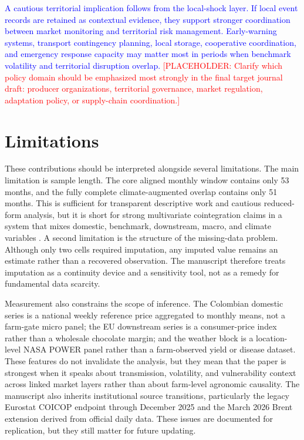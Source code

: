 \documentclass[11pt]{article}
\newcommand{\vTwo}[1]{\textcolor{blue}{#1}}
\newcommand{\placeholder}[1]{\textcolor{red}{[PLACEHOLDER: #1]}}
\begin{document}
\vTwo{A cautious territorial implication follows from the local-shock layer. If local event records are retained as contextual evidence, they support stronger coordination between market monitoring and territorial risk management. Early-warning systems, transport contingency planning, local storage, cooperative coordination, and emergency response capacity may matter most in periods when benchmark volatility and territorial disruption overlap.} \placeholder{Clarify which policy domain should be emphasized most strongly in the final target journal draft: producer organizations, territorial governance, market regulation, adaptation policy, or supply-chain coordination.}

\section{Limitations}
\label{sec:limitations}

These contributions should be interpreted alongside several limitations. The main limitation is sample length. The core aligned monthly window contains only 53 months, and the fully complete climate-augmented overlap contains only 51 months. This is sufficient for transparent descriptive work and cautious reduced-form analysis, but it is short for strong multivariate cointegration claims in a system that mixes domestic, benchmark, downstream, macro, and climate variables \citep{hakkio_rush_1991}. A second limitation is the structure of the missing-data problem. Although only two cells required imputation, any imputed value remains an estimate rather than a recovered observation. The manuscript therefore treats imputation as a continuity device and a sensitivity tool, not as a remedy for fundamental data scarcity.

Measurement also constrains the scope of inference. The Colombian domestic series is a national weekly reference price aggregated to monthly means, not a farm-gate micro panel; the EU downstream series is a consumer-price index rather than a wholesale chocolate margin; and the weather block is a location-level NASA POWER panel rather than a farm-observed yield or disease dataset. These features do not invalidate the analysis, but they mean that the paper is strongest when it speaks about transmission, volatility, and vulnerability context across linked market layers rather than about farm-level agronomic causality. The manuscript also inherits institutional source transitions, particularly the legacy Eurostat COICOP endpoint through December 2025 and the March 2026 Brent extension derived from official daily data. These issues are documented for replication, but they still matter for future updating.
\end{document}
